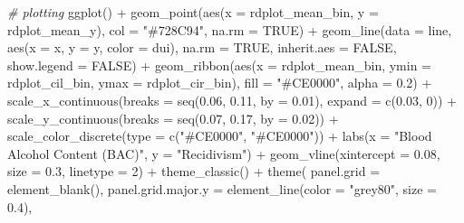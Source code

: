 \documentclass[
  11pt,
]{article}
\newenvironment{Shaded}{\begin{snugshade}}{\end{snugshade}}
\newcommand{\AttributeTok}[1]{\textcolor[rgb]{0.77,0.63,0.00}{#1}}
\newcommand{\CommentTok}[1]{\textcolor[rgb]{0.56,0.35,0.01}{\textit{#1}}}
\newcommand{\ConstantTok}[1]{\textcolor[rgb]{0.00,0.00,0.00}{#1}}
\newcommand{\DecValTok}[1]{\textcolor[rgb]{0.00,0.00,0.81}{#1}}
\newcommand{\FloatTok}[1]{\textcolor[rgb]{0.00,0.00,0.81}{#1}}
\newcommand{\FunctionTok}[1]{\textcolor[rgb]{0.00,0.00,0.00}{#1}}
\newcommand{\NormalTok}[1]{#1}
\newcommand{\SpecialCharTok}[1]{\textcolor[rgb]{0.00,0.00,0.00}{#1}}
\newcommand{\StringTok}[1]{\textcolor[rgb]{0.31,0.60,0.02}{#1}}
\begin{document}
\begin{Shaded}
\begin{Highlighting}[]
\CommentTok{\# plotting}
\FunctionTok{ggplot}\NormalTok{() }\SpecialCharTok{+} 
  \FunctionTok{geom\_point}\NormalTok{(}\FunctionTok{aes}\NormalTok{(}\AttributeTok{x =}\NormalTok{ rdplot\_mean\_bin, }\AttributeTok{y =}\NormalTok{ rdplot\_mean\_y), }
            \AttributeTok{col =} \StringTok{"\#728C94"}\NormalTok{, }\AttributeTok{na.rm =} \ConstantTok{TRUE}\NormalTok{) }\SpecialCharTok{+}
  \FunctionTok{geom\_line}\NormalTok{(}\AttributeTok{data =}\NormalTok{ line, }\FunctionTok{aes}\NormalTok{(}\AttributeTok{x =}\NormalTok{ x, }\AttributeTok{y =}\NormalTok{ y, }\AttributeTok{color =}\NormalTok{ dui), }
            \AttributeTok{na.rm =} \ConstantTok{TRUE}\NormalTok{, }\AttributeTok{inherit.aes =} \ConstantTok{FALSE}\NormalTok{, }\AttributeTok{show.legend =} \ConstantTok{FALSE}\NormalTok{) }\SpecialCharTok{+}
  \FunctionTok{geom\_ribbon}\NormalTok{(}\FunctionTok{aes}\NormalTok{(}\AttributeTok{x =}\NormalTok{ rdplot\_mean\_bin, }\AttributeTok{ymin =}\NormalTok{ rdplot\_cil\_bin, }\AttributeTok{ymax =}\NormalTok{ rdplot\_cir\_bin),}
              \AttributeTok{fill =} \StringTok{"\#CE0000"}\NormalTok{, }\AttributeTok{alpha =} \FloatTok{0.2}\NormalTok{) }\SpecialCharTok{+}
  \FunctionTok{scale\_x\_continuous}\NormalTok{(}\AttributeTok{breaks =} \FunctionTok{seq}\NormalTok{(}\FloatTok{0.06}\NormalTok{, }\FloatTok{0.11}\NormalTok{, }\AttributeTok{by =} \FloatTok{0.01}\NormalTok{), }\AttributeTok{expand =} \FunctionTok{c}\NormalTok{(}\FloatTok{0.03}\NormalTok{, }\DecValTok{0}\NormalTok{)) }\SpecialCharTok{+}
  \FunctionTok{scale\_y\_continuous}\NormalTok{(}\AttributeTok{breaks =} \FunctionTok{seq}\NormalTok{(}\FloatTok{0.07}\NormalTok{, }\FloatTok{0.17}\NormalTok{, }\AttributeTok{by =} \FloatTok{0.02}\NormalTok{)) }\SpecialCharTok{+}
  \FunctionTok{scale\_color\_discrete}\NormalTok{(}\AttributeTok{type =} \FunctionTok{c}\NormalTok{(}\StringTok{"\#CE0000"}\NormalTok{, }\StringTok{"\#CE0000"}\NormalTok{)) }\SpecialCharTok{+}
  \FunctionTok{labs}\NormalTok{(}\AttributeTok{x =} \StringTok{"Blood Alcohol Content (BAC)"}\NormalTok{, }\AttributeTok{y =} \StringTok{"Recidivism"}\NormalTok{) }\SpecialCharTok{+}
  \FunctionTok{geom\_vline}\NormalTok{(}\AttributeTok{xintercept =} \FloatTok{0.08}\NormalTok{, }\AttributeTok{size =} \FloatTok{0.3}\NormalTok{, }\AttributeTok{linetype =} \DecValTok{2}\NormalTok{) }\SpecialCharTok{+}
  \FunctionTok{theme\_classic}\NormalTok{() }\SpecialCharTok{+}
  \FunctionTok{theme}\NormalTok{(}
    \AttributeTok{panel.grid =} \FunctionTok{element\_blank}\NormalTok{(),}
    \AttributeTok{panel.grid.major.y =} \FunctionTok{element\_line}\NormalTok{(}\AttributeTok{color =} \StringTok{"grey80"}\NormalTok{, }\AttributeTok{size =} \FloatTok{0.4}\NormalTok{),}

\end{Highlighting}
\end{Shaded}
\end{document}
